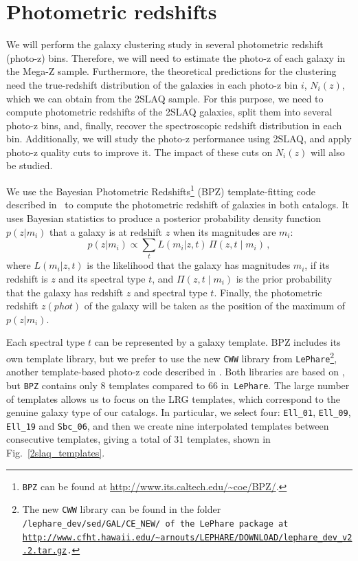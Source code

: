 \section{Photometric redshifts}
\label{sec:photoz}

We will perform the galaxy clustering study in several photometric redshift (photo-z) bins. Therefore, we will need to estimate the photo-z of each galaxy in the Mega-Z sample. Furthermore, the theoretical predictions for the clustering need the true-redshift distribution of the galaxies in each photo-z bin $i$, $N_i(z)$, which we can obtain from the 2SLAQ sample. 
For this purpose, we need to compute photometric redshifts of the 2SLAQ galaxies, split them into several photo-z bins, and, finally, recover the spectroscopic redshift distribution in each bin. Additionally, we will study the photo-z performance using 2SLAQ, and apply photo-z quality cuts to improve it. The impact of these cuts on $N_i(z)$ will also be studied.

We use the Bayesian Photometric Redshifts\footnote{\texttt{BPZ} can be found at \url{http://www.its.caltech.edu/~coe/BPZ/}.} (BPZ) template-fitting code described in~\citet{Benitez2000} to compute the photometric redshift of galaxies in both catalogs. It uses Bayesian statistics to produce a posterior probability density function $p(z|m_i)$ that a galaxy is at redshift $z$ when its magnitudes are $m_i$:
\begin{equation}
p(z|m_i) \propto \sum_t L(m_i|z,t) \, \Pi(z,t \mid m_i)  \, ,
\label{pz}
\end{equation} 
where $L(m_i|z,t)$ is the likelihood that the galaxy has magnitudes $m_i$, if its redshift is $z$ and its spectral type $t$, and $\Pi(z,t \mid m_i)$ is the prior probability that the galaxy has redshift $z$ and spectral type $t$. Finally, the photometric redshift $z(phot)$ of the galaxy will be taken as the position of the maximum of $p(z|m_i)$.

Each spectral type $t$ can be represented by a galaxy template. BPZ includes its own template library, but we prefer to use the new \texttt{CWW} library from \texttt{LePhare}\footnote{The new \texttt{CWW} library can be found in the folder \tt{/lephare\_dev/sed/GAL/CE\_NEW/} of the \texttt{LePhare} package at \url{http://www.cfht.hawaii.edu/~arnouts/LEPHARE/DOWNLOAD/lephare\_dev\_v2.2.tar.gz}.}, another template-based photo-z code described in \citet{Arnouts1999,Ilbert2006}. Both libraries are based on \citet{Coleman1980,Kinney1996}, but \texttt{BPZ} contains only 8 templates compared to 66 in~\texttt{LePhare}. The large number of templates allows us to focus on the LRG templates, which correspond to the genuine galaxy type of our catalogs. In particular, we select four: \texttt{Ell\_01}, \texttt{Ell\_09}, \texttt{Ell\_19} and \texttt{Sbc\_06}, and then we create nine interpolated templates between consecutive templates, giving a total of 31 templates, shown in Fig.~\ref{2slaq_templates}.

